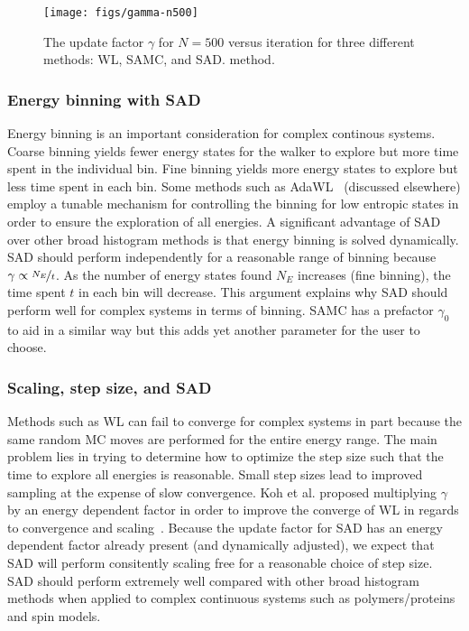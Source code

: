 \documentclass[letterpaper,twocolumn,amsmath,amssymb,pre,aps,10pt]{revtex4-1}
\begin{document}
\begin{figure}
  \texttt{[image: figs/gamma-n500]}
  \caption{The update factor $\gamma$ for $N=500$ versus iteration for three
    different methods: WL, SAMC, and SAD.
    method.}\label{fig:gamma-vs-t}
\end{figure}

\subsubsection{Energy binning with SAD}

Energy binning is an important consideration for complex continous
systems. Coarse binning yields fewer energy states for the walker to
explore but more time spent in the individual bin. Fine binning yields
more energy states to explore but less time spent in each bin.  Some
methods such as AdaWL~\cite{koh2013dynamically} (discussed elsewhere)
employ a tunable mechanism for controlling the binning for low entropic
states in order to ensure the exploration of all energies. A
significant advantage of SAD over other broad histogram methods is that
energy binning is solved dynamically. SAD should perform independently
for a reasonable range of binning because $\gamma \propto
\nicefrac{N_{E}}{t}$.  As the number of energy states found $N_{E}$
increases (fine binning), the time spent $t$ in each bin will decrease.
This argument explains why SAD should perform well for complex systems
in terms of binning. SAMC has a prefactor $\gamma_0$ to aid in a
similar way but this adds yet another parameter for the user to choose.

\subsubsection{Scaling, step size, and SAD}
Methods such as WL can fail to converge for complex systems in part
because the same random MC moves are performed for the entire energy
range.  The main problem lies in trying to determine how to optimize
the step size such that the time to explore all energies is reasonable.
Small step sizes lead to improved sampling at the expense of slow
convergence. Koh et al. proposed multiplying $\gamma$ by an energy
dependent factor in order to improve the converge of WL in regards to
convergence and scaling~\cite{koh2013dynamically}.  Because the update
factor for SAD has an energy dependent factor already present (and
dynamically adjusted), we expect that SAD will perform consitently
scaling free for a reasonable choice of step size.  SAD should perform
extremely well compared with other broad histogram methods when applied
to complex continuous systems such as polymers/proteins and spin models.
\end{document}

